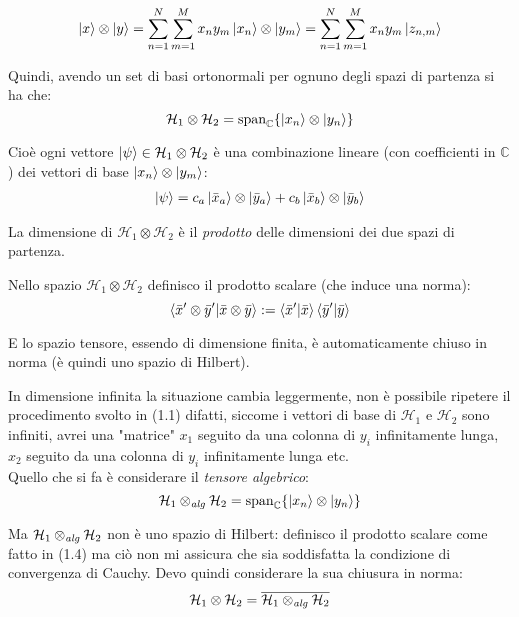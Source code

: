 \begin{equation}
\ket{x} \otimes \ket{y} = \sum_{n=1}^N \sum_{m=1}^M {x_n}{y_m} \ket{x_n} \otimes \ket{y_m} =\sum_{n=1}^N \sum_{m=1}^M {x_n}{y_m} \left |z_{n,m} \right\rangle
\end{equation}

Quindi, avendo un set di basi ortonormali per ognuno degli spazi di partenza si ha che: $$\mathcal{H}_1 \otimes \mathcal{H}_2 =\textrm{span}_{\mathbb{C}}  \{ \ket{x_n} \otimes \ket{y_n} \} $$

Cioè ogni vettore $\ket{\psi} \in \mathcal{H}_1 \otimes \mathcal{H}_2 $  è una combinazione lineare (con coefficienti in $ \mathbb{C} $) dei vettori di base $\ket{x_n} \otimes \ket{y_m} $:
\begin{equation}\begin{split}
\ket{\psi} = c_a\left |\bar x_a \right\rangle\otimes\left |\bar y_a \right\rangle+c_b\left |\bar x_b \right\rangle\otimes\left |\bar y_b \right\rangle
\end{split}\end{equation}

La dimensione di $\mathcal{H}_1 \otimes \mathcal{H}_2 $ è il \emph{ prodotto } delle dimensioni dei due spazi di partenza.

Nello spazio $\mathcal{H}_1 \otimes \mathcal{H}_2$ definisco il prodotto scalare (che induce una norma):
\begin{equation}
\braket{\bar x' \otimes \bar y' | \bar x \otimes \bar y} := \braket{\bar x' | \bar x} \braket {\bar y' | \bar y }
\end{equation}

E lo spazio tensore, essendo di dimensione finita, è automaticamente chiuso in norma (è quindi uno spazio di Hilbert).

In dimensione infinita la situazione cambia leggermente, non è possibile ripetere il procedimento svolto in (1.1) difatti, siccome i vettori di base di $\mathcal{H}_1 \textrm{ e } \mathcal{H}_2 $ sono infiniti, avrei una "matrice" $x_1$ seguito da una colonna di $y_i$ infinitamente lunga, $x_2$ seguito da una colonna di $y_i$ infinitamente lunga etc. \\
Quello che si fa è considerare il \emph{tensore algebrico}:
\begin{equation}
\mathcal{H}_1 \otimes_{ \textrm{\textit{alg}}} \mathcal{H}_2 =  \textrm{span}_{\mathbb{C}}  \{ \ket{x_n} \otimes \ket{y_n} \} 
\end{equation}

Ma $\mathcal{H}_1 \otimes_{ \textrm{\textit{alg}}} \mathcal{H}_2 $ non è uno spazio di Hilbert: definisco il prodotto scalare come fatto in (1.4) ma ciò non mi assicura che sia soddisfatta la condizione di convergenza di Cauchy.
Devo quindi considerare la sua chiusura in norma:
\begin{equation}
\mathcal{H}_1 \otimes \mathcal{H}_2 = \overline{ \mathcal{H}_1 \otimes_{ \textrm{\textit{alg}}} \mathcal{H }_2}
\end{equation}


